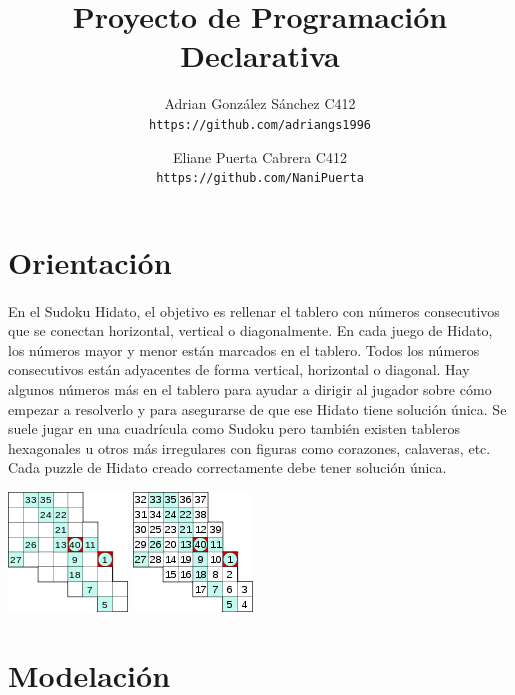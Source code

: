 \documentclass[a4paper, 12pt]{article}
\begin{document}
\title{Proyecto de Programaci\'on Declarativa}
\author{
   Adrian Gonz\'alez S\'anchez C412\\
   \texttt{https://github.com/adriangs1996}
   \and
   Eliane Puerta Cabrera C412\\
   \texttt{https://github.com/NaniPuerta}
}
\maketitle
\section*{Orientaci\'on}
\paragraph{}
En el Sudoku Hidato, el objetivo es rellenar el tablero con números consecutivos que se conectan
horizontal, vertical o diagonalmente. En cada juego de Hidato, los números mayor y menor
están marcados en el tablero. Todos los números consecutivos están adyacentes de forma vertical,
horizontal o diagonal. Hay algunos números más en el tablero para ayudar a dirigir al jugador
sobre cómo empezar a resolverlo y para asegurarse de que ese Hidato tiene solución única. Se
suele jugar en una cuadrícula como Sudoku pero también existen tableros hexagonales u otros más
irregulares con figuras como corazones, calaveras, etc. Cada puzzle de Hidato creado
correctamente debe tener solución única.

\includegraphics{HidatoExample.png}
\includegraphics{HidatoExampleSolved.png}

\section*{Modelaci\'on}
\end{document}

